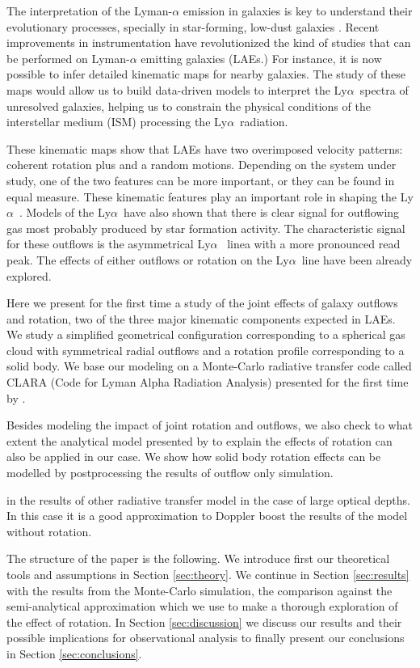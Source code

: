 \documentclass[a4paper,fleqn,usenatbib]{mnras}
\newcommand{\lya}{\ifmmode{{\rm Ly}\alpha}\else Ly$\alpha$\ \fi}
\begin{document}
The interpretation of the Lyman-$\alpha$ emission in galaxies is
key to understand their evolutionary processes, specially in
star-forming, low-dust galaxies \citep{PartridgePeebles}.
Recent improvements in instrumentation have revolutionized the kind of
studies that can be performed on Lyman-$\alpha$ emitting galaxies
(LAEs.)
For instance, it is now possible to infer detailed kinematic maps for
nearby galaxies.
The study of these maps would allow us to build data-driven models to
interpret the \lya spectra of unresolved galaxies, helping us to
constrain the physical conditions of the interstellar medium (ISM)
processing the \lya radiation.

These kinematic maps show that LAEs have two  overimposed velocity
patterns: coherent rotation plus and a random motions.
Depending on the system under study, one of the two features can be
more important, or they can be found in equal measure.
These kinematic features play an important role in shaping the \lya.
Models of the \lya have also shown that there is clear signal for
outflowing gas most probably produced by star formation activity.
The characteristic signal for these outflows is the asymmetrical \lya
linea with a more pronounced read peak.
The effects of either outflows or rotation on the \lya line have been
already explored.

Here we present for the first time a study of the joint effects of
galaxy outflows and rotation, two of the three major kinematic
components expected in LAEs.
We study a simplified geometrical configuration corresponding to a
spherical gas cloud with symmetrical radial outflows and a rotation
profile corresponding to a solid body.
We base our modeling on a Monte-Carlo radiative transfer code called
CLARA (Code for Lyman Alpha Radiation Analysis) presented for the
first time by \cite{CLARA}.

Besides modeling the impact of joint rotation and outflows, we also
check to what extent the analytical model presented by
\cite{Garavito14} to explain the effects of rotation can also be
applied in our case.
We show how solid body rotation effects can be modelled by
postprocessing the results of outflow only simulation.

in the results of other radiative transfer model in the case of large
optical depths.
In this case it is a good approximation to Doppler
boost the results of the model without rotation.

The structure of the paper is the following.
We introduce first our theoretical tools and assumptions
in Section \ref{sec:theory}. We continue in Section  \ref{sec:results}
with the results from the Monte-Carlo simulation, the comparison
against the semi-analytical approximation which we use to make a
thorough exploration of the effect of rotation.
In Section \ref{sec:discussion} we discuss our results and their
possible implications for observational analysis to finally present
our conclusions in Section \ref{sec:conclusions}.
\end{document}

